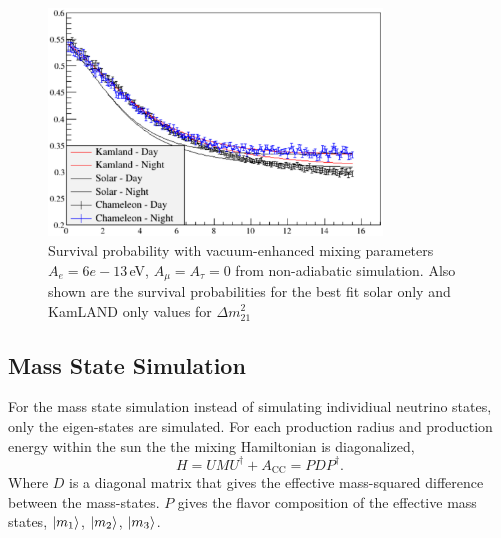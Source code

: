 \begin{figure}[htbp]
    \centering
    \includegraphics[width=0.79\textwidth]{non_adiabatic_example}
    \caption[Example Non-adiabatic Vacuum-Enhanced Neutrino Survival Probability]{
        Survival probability with vacuum-enhanced mixing parameters
        $A_{e}=6e-13$\,eV, $A_{\mu}=A_{\tau}=0$
    from non-adiabatic simulation. Also shown are the survival probabilities
    for the best fit solar only and KamLAND only values for $\Delta m^{2}_{21}$}
    \label{fig:nonadiabatic_example}
\end{figure}

\subsection{Mass State Simulation} %
For the mass state simulation instead of simulating individiual neutrino
states, only the eigen-states are simulated.
For each production radius and production energy within the sun the
the mixing Hamiltonian is diagonalized,
\begin{equation}
    H = U M U^{\dagger} + A_{\mathrm{CC}} = P D P^{\dagger}\text{.}
\end{equation}
Where $D$ is a diagonal matrix that gives the effective mass-squared
difference between the mass-states.
$P$ gives the flavor composition of the effective mass states,
$\ket{m_{1}}$, $\ket{m_{2}}$, $\ket{m_{3}}$.

